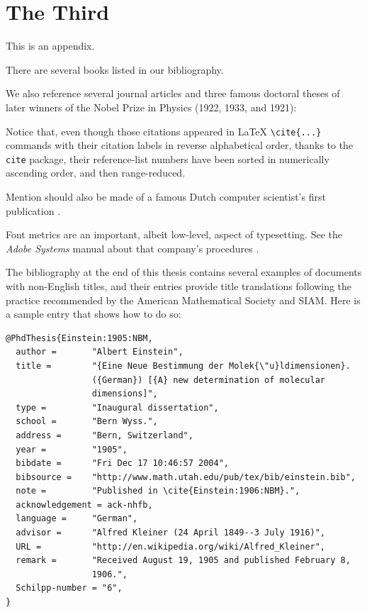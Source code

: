 
\chapter{The Third}

This is an appendix.

There are several books
\cite{%
    Singh:1997:FEE,%
    Salomon:1995:AT,%
    Robbins:2005:CSS,%
    Randell:1982:ODC,%
    Olver:2010:NHM,%
    Mittelbach:2004:LC,%
    Lamport:1985:LDP,%
    Knuth:1999:DT,%
    Knuth:1986:TB,%
    Knuth:1986:MB,%
    Farmelo:2009:SMH%
}
listed in our bibliography.

We also reference several journal articles
\cite{%
    Wiles:1995:MEC,%
    Taylor:1995:RTP,%
    Lahiri:2002:ADA,%
    Kim:1999:AFC,%
    Johnson:1978:LDT,%
    Huskey:1980:LLC,%
    Heilbron:1969:GBA,%
    Hall:1994:PNE,%
    Goldstine:1946:ENI,%
    Einstein:1911:BMAb,%
    Einstein:1911:BMAa,%
    Einstein:1906:NBM,%
    Cody:1981:APF,%
    Beebe:1989:PCP,%
    Babbage:1910:BBA%
}
and three famous doctoral theses of later winners
\cite{%
    Einstein:1905:NBM,%
    Dirac:1926:QM,%
    Bohr:1911:SME%
}
of the Nobel Prize in Physics (1922, 1933, and
1921):

Notice that, even though those citations appeared
in \LaTeX{} \verb=\cite{...}= commands with their
\BibTeX{} citation labels in reverse alphabetical
order, thanks to the \verb=cite= package,
their reference-list numbers have been sorted in
numerically ascending order, and then
range-reduced.

Mention should also be made of a famous Dutch
computer scientist's first publication
\cite{Dijkstra:1953:FBV}.

Font metrics are an important, albeit low-level,
aspect of typesetting. See the \emph{Adobe
Systems} manual about that company's procedures
\cite{Adobe:1990:AFM}.

The bibliography at the end of this thesis contains several examples
of documents with non-English titles, and their \BibTeX{} entries
provide title translations following the practice recommended by the
American Mathematical Society and SIAM\@.  Here is a sample entry that
shows how to do so:
%
\begin{verbatim}
@PhdThesis{Einstein:1905:NBM,
  author =       "Albert Einstein",
  title =        "{Eine Neue Bestimmung der Molek{\"u}ldimensionen}.
                 ({German}) [{A} new determination of molecular
                 dimensions]",
  type =         "Inaugural dissertation",
  school =       "Bern Wyss.",
  address =      "Bern, Switzerland",
  year =         "1905",
  bibdate =      "Fri Dec 17 10:46:57 2004",
  bibsource =    "http://www.math.utah.edu/pub/tex/bib/einstein.bib",
  note =         "Published in \cite{Einstein:1906:NBM}.",
  acknowledgement = ack-nhfb,
  language =     "German",
  advisor =      "Alfred Kleiner (24 April 1849--3 July 1916)",
  URL =          "http://en.wikipedia.org/wiki/Alfred_Kleiner",
  remark =       "Received August 19, 1905 and published February 8,
                 1906.",
  Schilpp-number = "6",
}
\end{verbatim}

